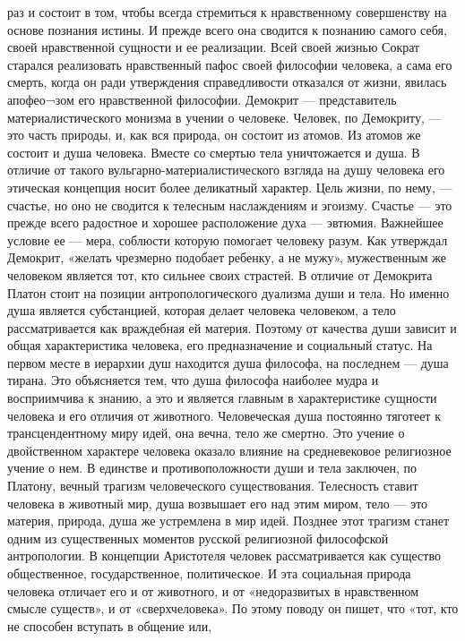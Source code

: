 \documentclass[12pt]{article}
\begin{document}
раз и состоит в том, чтобы всегда стремиться к нравственному совершенству на основе познания истины. И
прежде всего она сводится к познанию самого себя, своей нравственной сущности и ее реализации.
Всей своей жизнью Сократ старался реализовать нравственный пафос своей философии человека, а сама его
смерть, когда он ради утверждения справедливости отказался от жизни, явилась апофео¬зом его нравственной
философии.
Демокрит — представитель материалистического монизма в учении о человеке. Человек, по Демокриту, — это
часть природы, и, как вся природа, он состоит из атомов. Из атомов же состоит и душа человека. Вместе со
смертью  тела уничтожается  и душа.  В отличие  от такого вульгарно-материалистического  взгляда  на душу
человека его этическая концепция носит более деликатный характер. Цель жизни, по нему, — счастье, но оно не
сводится к телесным наслаждениям и эгоизму. Счастье — это прежде всего радостное и хорошее расположение
духа — эвтюмия. Важнейшее условие ее — мера, соблюсти которую помогает человеку разум. Как утверждал
Демокрит, «желать чрезмерно подобает ребенку, а не мужу», мужественным же человеком является тот, кто
сильнее своих страстей.
В отличие от Демокрита Платон стоит на позиции антропологического дуализма души и тела. Но именно душа
является субстанцией, которая делает человека человеком, а тело рассматривается как враждебная ей материя.
Поэтому от качества души зависит и общая характеристика человека, его предназначение и социальный статус.
На первом месте в иерархии душ находится душа философа, на последнем — душа тирана. Это объясняется
тем, что душа философа наиболее мудра и восприимчива к знанию, а это и является главным в характеристике
сущности человека и его отличия от животного.
Человеческая душа постоянно тяготеет к трансцендентному миру идей, она вечна, тело же смертно. Это учение
о двойственном характере человека оказало влияние на средневековое религиозное учение о нем. В единстве и
противоположности  души  и  тела  заключен,  по  Платону,  вечный  трагизм  человеческого  существования.
Телесность ставит человека  в  животный  мир,  душа  возвышает его  над этим  миром, тело  — это материя,
природа, душа же устремлена в мир идей. Позднее этот трагизм станет одним из существенных моментов
русской религиозной философской антропологии.
В концепции Аристотеля человек рассматривается как существо общественное, государственное, политическое.
И эта социальная природа человека отличает его и от животного, и от «недоразвитых в нравственном смысле
существ», и от «сверхчеловека». По этому поводу он пишет, что «тот, кто не способен вступать в общение или,
\end{document}

